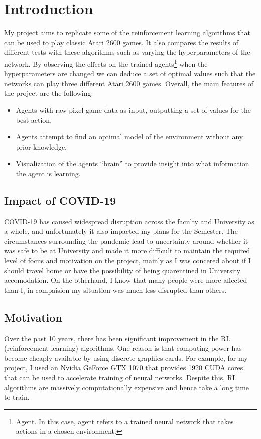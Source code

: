 \chapter{Introduction}
\label{cha:intro}
My project aims to replicate some of the reinforcement learning algorithms that can be used to play classic Atari 2600 games. It also compares the results of different tests with these algorithms such as varying the hyperparameters of the network. By observing the effects on the trained agents\footnote{Agent. In this case, agent refers to a trained neural network that takes actions in a chosen environment.} when the hyperparameters are changed we can deduce a set of optimal values such that the networks can play three different Atari 2600 games. Overall, the main features of the project are the following:
\begin{itemize}
	\item Agents with raw pixel game data as input, outputting a set of values for the best action.
	\item Agents attempt to find an optimal model of the environment without any prior knowledge.
	\item Visualization of the agents ``brain'' to provide insight into what information the agent is learning.
\end{itemize}

\section{Impact of COVID-19}
COVID-19 has caused widespread disruption across the faculty and University as a whole, and unfortunately it also impacted my plans for the Semester. The circumstances surrounding the pandemic lead to uncertainty around whether it was safe to be at University and made it more difficult to maintain the required level of focus and motivation on the project, mainly as I was concered about if I should travel home or have the possibility of being quarentined in University accomodation. On the otherhand, I know that many people were more affected than I, in compaision my situation was much less disrupted than others.

\section{Motivation}
\label{intro:sec:moti}
Over the past 10 years, there has been significant improvement in the RL (reinforcement learning) algorithms. One reason is that computing power has become cheaply available by using discrete graphics cards. For example, for my project, I used an Nvidia GeForce GTX 1070 that provides 1920 CUDA cores that can be used to accelerate training of neural networks. Despite this, RL algorithms are massively computationally expensive and hence take a long time to train.

